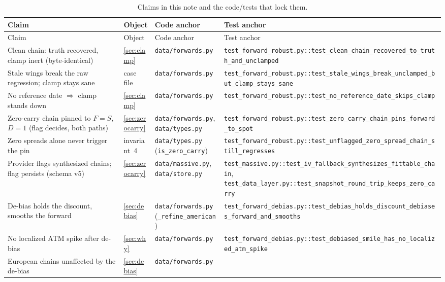 \documentclass[11pt]{article}
\begin{document}
\begingroup
\small
\setlength{\tabcolsep}{3pt}
\begin{longtable}{@{}p{}p{}p{}p{}@{}}
\caption{Claims in this note and the code/tests that lock them.}\\
\toprule Claim & Object & Code anchor & Test anchor\\ \midrule
\endfirsthead
\toprule Claim & Object & Code anchor & Test anchor\\ \midrule
\endhead
Clean chain: truth recovered, clamp inert (byte-identical) &
\cref{sec:clamp} &
\nolinkurl{data/forwards.py} &
\nolinkurl{test_forward_robust.py::test_clean_chain_recovered_to_truth_and_unclamped}\\
Stale wings break the raw regression; clamp stays sane &
case file &
\nolinkurl{data/forwards.py} &
\nolinkurl{test_forward_robust.py::test_stale_wings_break_unclamped_but_clamp_stays_sane}\\
No reference date $\Rightarrow$ clamp stands down &
\cref{sec:clamp} &
\nolinkurl{data/forwards.py} &
\nolinkurl{test_forward_robust.py::test_no_reference_date_skips_clamp}\\
Zero-carry chain pinned to $F=S$, $D=1$ (flag decides, both paths) &
\cref{sec:zerocarry} &
\nolinkurl{data/forwards.py}, \nolinkurl{data/types.py} &
\nolinkurl{test_forward_robust.py::test_zero_carry_chain_pins_forward_to_spot}\\
Zero spreads alone never trigger the pin &
invariant~4 &
\nolinkurl{data/types.py} (\nolinkurl{is_zero_carry}) &
\nolinkurl{test_forward_robust.py::test_unflagged_zero_spread_chain_still_regresses}\\
Provider flags synthesized chains; flag persists (schema v5) &
\cref{sec:zerocarry} &
\nolinkurl{data/massive.py}, \nolinkurl{data/store.py} &
\nolinkurl{test_massive.py::test_iv_fallback_synthesizes_fittable_chain}, \nolinkurl{test_data_layer.py::test_snapshot_round_trip_keeps_zero_carry}\\
De-bias holds the discount, smooths the forward &
\cref{sec:debias} &
\nolinkurl{data/forwards.py} (\nolinkurl{_refine_american}) &
\nolinkurl{test_forward_debias.py::test_debias_holds_discount_debiases_forward_and_smooths}\\
No localized ATM spike after de-bias &
\cref{sec:why} &
\nolinkurl{data/forwards.py} &
\nolinkurl{test_forward_debias.py::test_debiased_smile_has_no_localized_atm_spike}\\
European chains unaffected by the de-bias &
\cref{sec:debias} &
\nolinkurl{data/forwards.py} &

\end{longtable}
\end{document}
